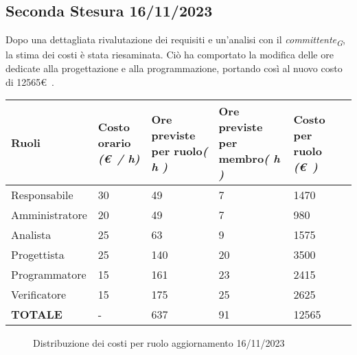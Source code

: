 \subsection{Seconda Stesura 16/11/2023}\label{sec:SecondaStesura}
Dopo una dettagliata rivalutazione dei requisiti e un'analisi con il \textit{committente}\textsubscript{\textit{G}}, la stima dei costi è stata riesaminata. Ciò ha comportato la modifica delle ore dedicate alla progettazione e alla programmazione, portando così al nuovo costo di 12565\euro\ .
\begin{center}
    \begin{tabular}{|C{3cm}|C{2cm}|C{2cm}|C{2cm}|C{2cm}|C{2cm}|}
        \hline

        \textbf{Ruoli}  & \textbf{Costo orario} \linebreak \textit{(\euro\ / h)} & \textbf{Ore previste per ruolo}\linebreak \textit{( h )} & \textbf{Ore previste per membro}\linebreak \textit{( h )} & \textbf{Costo per ruolo} \linebreak \textit{(\euro\ )} \\
        \hline\hline

        Responsabile & 30 & 49 & 7 & 1470 \\
        \hline
        Amministratore & 20 & 49 & 7 & 980 \\
        \hline
        Analista & 25 & 63 & 9 & 1575 \\
        \hline
        Progettista & 25 & 140 & 20 & 3500 \\
        \hline
        Programmatore & 15 & 161 & 23 & 2415 \\
        \hline
        Verificatore & 15 & 175 & 25 & 2625 \\
        \hline\hline

        \textbf{TOTALE} & - & 637 & 91 & 12565 \\
        \hline
    \end{tabular}
\end{center}
\begin{figure}[H]
    \centering
    \caption{Distribuzione dei costi per ruolo aggiornamento 16/11/2023}
\end{figure}

